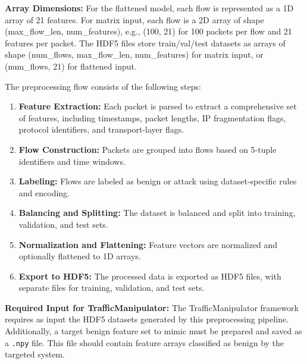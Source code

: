 \textbf{Array Dimensions:} For the flattened model, each flow is represented as a 1D array of 21 features. For matrix input, each flow is a 2D array of shape (max\_flow\_len, num\_features), e.g., (100, 21) for 100 packets per flow and 21 features per packet. The HDF5 files store train/val/test datasets as arrays of shape (num\_flows, max\_flow\_len, num\_features) for matrix input, or (num\_flows, 21) for flattened input.

The preprocessing flow consists of the following steps:
\begin{enumerate}
    \item \textbf{Feature Extraction:} Each packet is parsed to extract a comprehensive set of features, including timestamps, packet lengths, IP fragmentation flags, protocol identifiers, and transport-layer flags.
    \item \textbf{Flow Construction:} Packets are grouped into flows based on 5-tuple identifiers and time windows.
    \item \textbf{Labeling:} Flows are labeled as benign or attack using dataset-specific rules and encoding.
    \item \textbf{Balancing and Splitting:} The dataset is balanced and split into training, validation, and test sets.
    \item \textbf{Normalization and Flattening:} Feature vectors are normalized and optionally flattened to 1D arrays.
    \item \textbf{Export to HDF5:} The processed data is exported as HDF5 files, with separate files for training, validation, and test sets.
\end{enumerate}

\textbf{Required Input for TrafficManipulator:} The TrafficManipulator framework requires as input the HDF5 datasets generated by this preprocessing pipeline. Additionally, a target benign feature set to mimic must be prepared and saved as a \texttt{.npy} file. This file should contain feature arrays classified as benign by the targeted system.

